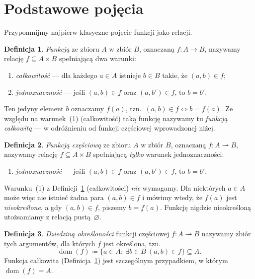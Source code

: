 \documentclass[11pt,a4paper]{article}
\theoremstyle{definition}
\newtheorem{definicja}{Definicja}[section]
\theoremstyle{plain}
\newcommand{\dom}{\operatorname{dom}}
\begin{document}
\section{Podstawowe pojęcia}

Przypomnijmy najpierw klasyczne pojęcie funkcji jako relacji.

\begin{definicja}\label{def:funkcja}
\emph{Funkcją} ze zbioru $A$ w zbiór $B$, oznaczaną $f:A\to B$, nazywamy relację
$f\subseteq A\times B$ spełniającą dwa warunki:
\begin{enumerate}
  \item[(1)] \emph{całkowitość} --- dla każdego $a\in A$ istnieje $b\in B$
        takie, że $(a,b)\in f$;
  \item[(2)] \emph{jednoznaczność} --- jeśli $(a,b)\in f$ oraz $(a,b')\in f$,
        to $b=b'$.
\end{enumerate}
Ten jedyny element $b$ oznaczamy $f(a)$, tzn.\ $(a,b)\in f \iff b=f(a)$.
Ze względu na warunek~(1) (całkowitość) taką funkcję nazywamy tu \emph{funkcją
całkowitą} --- w odróżnieniu od funkcji częściowej wprowadzonej niżej.
\end{definicja}

\begin{definicja}\label{def:funkcja-czesciowa}
\emph{Funkcją częściową} ze zbioru $A$ w zbiór $B$, oznaczaną $f:A\rightharpoonup B$,
nazywamy relację $f\subseteq A\times B$ spełniającą \emph{tylko} warunek
jednoznaczności:
\begin{enumerate}
  \item[(2)] \emph{jednoznaczność} --- jeśli $(a,b)\in f$ oraz $(a,b')\in f$, to $b=b'$.
\end{enumerate}
Warunku~(1) z Definicji~\ref{def:funkcja} (całkowitości) \emph{nie} wymagamy. Dla
niektórych $a\in A$ może więc nie istnieć żadna para $(a,b)\in f$ i mówimy wtedy, że
$f(a)$ jest \emph{nieokreślone}, a gdy $(a,b)\in f$, piszemy $b=f(a)$. Funkcję nigdzie
nieokreśloną utożsamiamy z relacją pustą~$\varnothing$.
\end{definicja}

\begin{definicja}\label{def:dziedzina_okreslonosci}
	\emph{Dziedziną określoności} funkcji częściowej $f:A\rightharpoonup B$ nazywamy zbiór tych argumentów, dla których $f$ jest określona, tzn.
	\[
	\dom(f)\coloneqq \{a\in A:\ \exists b\in B\ (a,b)\in f\}\subseteq A.
	\]
	Funkcja całkowita (Definicja~\ref{def:funkcja}) jest szczególnym przypadkiem, w którym $\dom(f)=A$.
\end{definicja}
\end{document}
